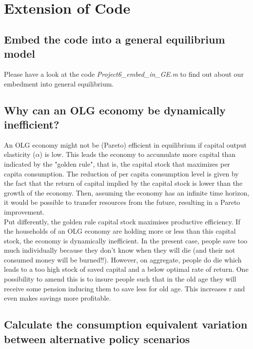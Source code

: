 \documentclass[12pt,a4paper]{article}
\begin{document}
\newpage

\section{Extension of Code}
\subsection{Embed the code into a general equilibrium model}

Please have a look at the code \textit{Project6\_embed\_in\_GE.m} to find out about our embedment into general equilibrium.

\subsection{Why can an OLG economy be dynamically inefficient?}

An OLG economy might not be (Pareto) efficient in equilibrium if capital output elasticity ($\alpha$) is low. This leads the economy to accumulate more capital than indicated by the "golden rule", that is, the capital stock that maximizes per capita consumption. The reduction of per capita consumption level is given by the fact that the return of capital implied by the capital stock is lower than the growth of the economy. Then, assuming the economy has an infinite time horizon, it would be possible to transfer resources from the future, resulting in a Pareto improvement. \\
Put differently, the golden rule capital stock maximises productive efficiency. If the households of an OLG economy are holding more or less than this capital stock, the economy is dynamically inefficient. In the present case, people save too much individually because they don't know when they will die (and their not consumed money will be burned!!). However, on aggregate, people do die which leads to a too high stock of saved capital and a below optimal rate of return. One possibility to amend this is to insure people such that in the old age they will receive some pension inducing them to save less for old age. This increases r and even makes savings more profitable. \\

\subsection{Calculate the consumption equivalent variation between alternative
policy scenarios}
\end{document}
